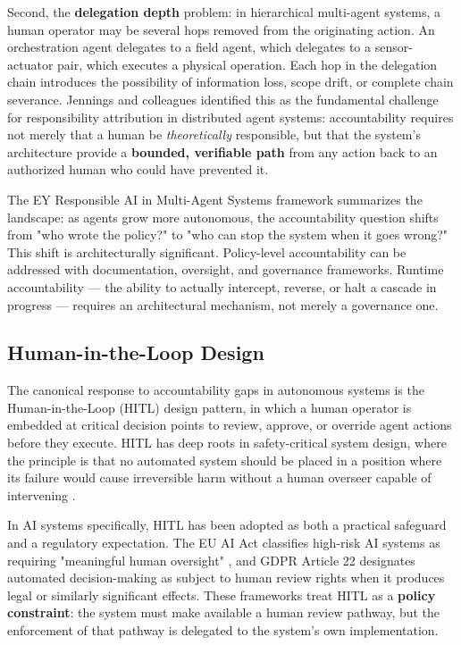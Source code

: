 Second, the \textbf{delegation depth} problem: in hierarchical multi-agent systems, a human operator may be several hops removed from the originating action. An orchestration agent delegates to a field agent, which delegates to a sensor-actuator pair, which executes a physical operation. Each hop in the delegation chain introduces the possibility of information loss, scope drift, or complete chain severance. Jennings and colleagues \cite{tristr81} identified this as the fundamental challenge for responsibility attribution in distributed agent systems: accountability requires not merely that a human be \emph{theoretically} responsible, but that the system's architecture provide a \textbf{bounded, verifiable path} from any action back to an authorized human who could have prevented it.

The EY Responsible AI in Multi-Agent Systems framework \cite{bansal2019} summarizes the landscape: as agents grow more autonomous, the accountability question shifts from "who wrote the policy?" to "who can stop the system when it goes wrong?" This shift is architecturally significant. Policy-level accountability can be addressed with documentation, oversight, and governance frameworks. Runtime accountability — the ability to actually intercept, reverse, or halt a cascade in progress — requires an architectural mechanism, not merely a governance one.

\subsection{Human-in-the-Loop Design}

The canonical response to accountability gaps in autonomous systems is the Human-in-the-Loop (HITL) design pattern, in which a human operator is embedded at critical decision points to review, approve, or override agent actions before they execute. HITL has deep roots in safety-critical system design, where the principle is that no automated system should be placed in a position where its failure would cause irreversible harm without a human overseer capable of intervening \cite{dijkstra1982}.

In AI systems specifically, HITL has been adopted as both a practical safeguard and a regulatory expectation. The EU AI Act classifies high-risk AI systems as requiring "meaningful human oversight" \cite{bansal2019}, and GDPR Article 22 designates automated decision-making as subject to human review rights when it produces legal or similarly significant effects. These frameworks treat HITL as a \textbf{policy constraint}: the system must make available a human review pathway, but the enforcement of that pathway is delegated to the system's own implementation.

